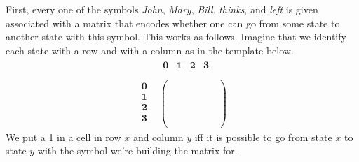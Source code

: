 First, every one of the symbols \emph{John}, \emph{Mary}, \emph{Bill}, \emph{thinks}, and \emph{left} is given associated with a matrix that encodes whether one can go from some state to another state with this symbol.
This works as follows.
Imagine that we identify each state with a row and with a column as in the template below.
%
\[
    \begin{array}{cc}
        &
        \begin{array}{cccc}
            \textbf{0} &
            \textbf{1} &
            \textbf{2} &
            \textbf{3} \\
        \end{array}
        \\
        \begin{array}{cccc}
            \textbf{0} \\
            \textbf{1} \\
            \textbf{2} \\
            \textbf{3} \\
        \end{array}
        &
        \left (
            \begin{array}{cccc}
                \phantom{0} & \phantom{1} & \phantom{0} & \phantom{0}\\
                \phantom{0} & \phantom{0} & \phantom{0} & \phantom{0}\\
                \phantom{0} & \phantom{0} & \phantom{0} & \phantom{0}\\
                \phantom{0} & \phantom{1} & \phantom{0} & \phantom{0}\\
            \end{array}
        \right )
    \end{array}
\]
%
We put a 1 in a cell in row $x$ and column $y$ iff it is possible to go from state $x$ to state $y$ with the symbol we're building the matrix for.

